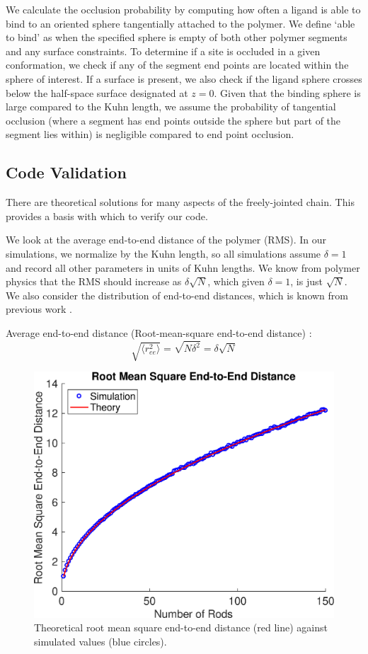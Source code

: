 \documentclass[../AdvancementSummary.tex]{subfiles}
\begin{document}
We calculate the occlusion probability by computing how often a ligand is able to bind to an oriented sphere tangentially attached to the polymer. We define `able to bind' as when the specified sphere is empty of both other polymer segments and any surface constraints. To determine if a site is occluded in a given conformation, we check if any of the segment end points are located within the sphere of interest. If a surface is present, we also check if the ligand sphere crosses below the half-space surface designated at $z=0$. Given that the binding sphere is large compared to the Kuhn length, we assume the probability of tangential occlusion (where a segment has end points outside the sphere but part of the segment lies within) is negligible compared to end point occlusion. 


\subsection{Code Validation}
There are theoretical solutions for many aspects of the freely-jointed chain. This provides a basis with which to verify our code. 

We look at the average end-to-end distance of the polymer (RMS). In our simulations, we normalize by the Kuhn length, so all simulations assume $\delta = 1$ and record all other parameters in units of Kuhn lengths. We know from polymer physics that the RMS should increase as $\delta \sqrt{N}$, which given $\delta = 1$, is just $\sqrt{N}$. We also consider the distribution of end-to-end distances, which is known from previous work \cite{VanValen2009, Reeves2011}.

Average end-to-end distance (Root-mean-square end-to-end distance) \cite{Reeves2011}:
\begin{equation*}
\sqrt{\langle r_{ee}^2 \rangle} = \sqrt{N\delta^2} = \delta \sqrt{N}
\end{equation*}

\begin{figure}[H]
\begin{center}
\includegraphics[width=0.5\linewidth]{ModelConfirmationFigures/RMSEndtoEnd.eps}
\caption{Theoretical root mean square end-to-end distance (red line) against simulated values (blue circles). \label{fig: RMS}}
\end{center}
\end{figure}
\end{document}

